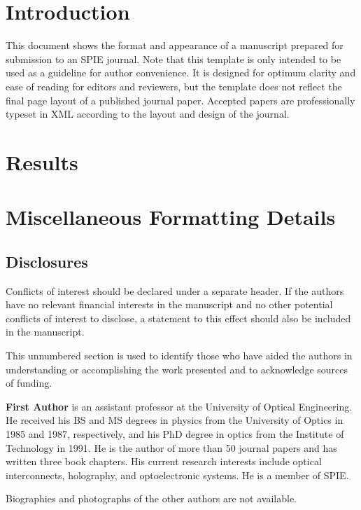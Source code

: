 \documentclass[12pt]{spieman}  %
\begin{document}
\begin{spacing}{2}   %

\section{Introduction}
\label{sect:intro}  %
This document shows the format and appearance of a manuscript prepared for submission to an SPIE journal. Note that this template is only intended to be used as a guideline for author convenience. It is designed for optimum clarity and ease of reading for editors and reviewers, but the template does not reflect the final page layout of a published journal paper. Accepted papers are professionally typeset in XML according to the layout and design of the journal. 

\section{Results}



\appendix    %

\section{Miscellaneous Formatting Details}
\label{sect:misc}


\subsection*{Disclosures}
Conflicts of interest should be declared under a separate header. If the authors have no relevant financial interests in the manuscript and no other potential conflicts of interest to disclose, a statement to this effect should also be included in the manuscript.

\acknowledgments 
This unnumbered section is used to identify those who have aided the authors in understanding or accomplishing the work presented and to acknowledge sources of funding.  




\vspace{2ex}\noindent\textbf{First Author} is an assistant professor at the University of Optical Engineering. He received his BS and MS degrees in physics from the University of Optics in 1985 and 1987, respectively, and his PhD degree in optics from the Institute of Technology in 1991.  He is the author of more than 50 journal papers and has written three book chapters. His current research interests include optical interconnects, holography, and optoelectronic systems. He is a member of SPIE.

\vspace{1ex}
\noindent Biographies and photographs of the other authors are not available.

\listoffigures
\listoftables

\end{spacing}
\end{document}
